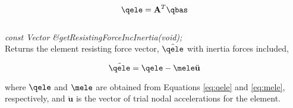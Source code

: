 \begin{equation}
\label{eq:qele}
\qele = \mathbf{A}^T \qbas
\end{equation} \\

{\em const Vector \&getResistingForceIncInertia(void);} \\
Returns the element resisting force vector, $\tilde{\qele}$ with inertia forces included,

\begin{equation}
\tilde{\qele} = \qele - \mele \ddot{\mathbf u}
\end{equation}

where $\qele$ and $\mele$ are obtained from Equations \ref{eq:qele} and \ref{eq:mele}, respectively,
and $\ddot{\mathbf u}$ is the vector of trial nodal accelerations for the element. \\